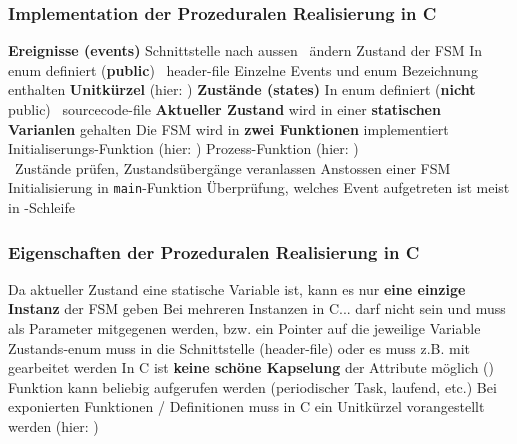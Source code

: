 \subsubsection{Implementation der Prozeduralen Realisierung in C}

\begin{outline}
    \1 \textbf{Ereignisse (events)}
        \2 Schnittstelle nach aussen \textrightarrow\ ändern Zustand der FSM
        \2 In enum definiert (\textbf{public}) \textrightarrow\ header-file
        \2 Einzelne Events und enum Bezeichnung enthalten \textbf{Unitkürzel} (hier: )
    \1 \textbf{Zustände (states)}
        \2 In enum definiert (\textbf{nicht} public) \textrightarrow\ sourcecode-file
    \1 \textbf{Aktueller Zustand} wird in einer \textbf{statischen Varianlen} gehalten
    \1 Die FSM wird in \textbf{zwei Funktionen} implementiert
        \2 Initialiserungs-Funktion (hier: )
        \2 Prozess-Funktion (hier: ) \\
            \textrightarrow\ Zustände prüfen, Zustandsübergänge veranlassen
    \1 Anstossen einer FSM
        \2 Initialisierung in \lstinline|main|-Funktion
        \2 Überprüfung, welches Event aufgetreten ist meist in -Schleife
\end{outline}


\subsubsection{Eigenschaften der Prozeduralen Realisierung in C}

\begin{outline}
    \1 Da aktueller Zustand eine statische Variable ist, kann es nur \textbf{eine einzige Instanz} der FSM geben
    \1 Bei mehreren Instanzen in C...
        \2 darf  nicht  sein und muss als Parameter mitgegenen werden,
            bzw. ein Pointer auf die jeweilige Variable
        \2 Zustands-enum muss in die Schnittstelle (header-file) oder es muss z.B. mit  gearbeitet werden
    \1 In C ist \textbf{keine schöne Kapselung} der Attribute möglich ()
    \1 Funktion  kann beliebig aufgerufen werden (periodischer Task, laufend, etc.)
    \1 Bei exponierten Funktionen / Definitionen muss in C ein Unitkürzel vorangestellt werden (hier: )
\end{outline}


